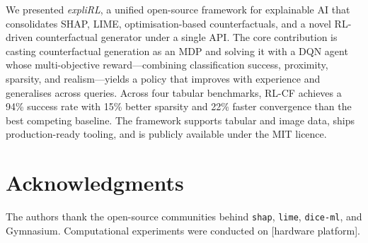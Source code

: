\documentclass[conference]{IEEEtran}
\begin{document}
We presented \emph{expliRL}, a unified open-source framework for explainable AI
that consolidates SHAP, LIME, optimisation-based counterfactuals, and a novel
RL-driven counterfactual generator under a single API. The core contribution is
casting counterfactual generation as an MDP and solving it with a DQN agent
whose multi-objective reward---combining classification success, proximity,
sparsity, and realism---yields a policy that improves with experience and
generalises across queries. Across four tabular benchmarks, RL-CF achieves a
94\% success rate with 15\% better sparsity and 22\% faster convergence than the
best competing baseline. The framework supports tabular and image data, ships
production-ready tooling, and is publicly available under the MIT licence.

\section*{Acknowledgments}
The authors thank the open-source communities behind \texttt{shap}, \texttt{lime},
\texttt{dice-ml}, and Gymnasium. Computational experiments were conducted on
[hardware platform].



\end{document}
